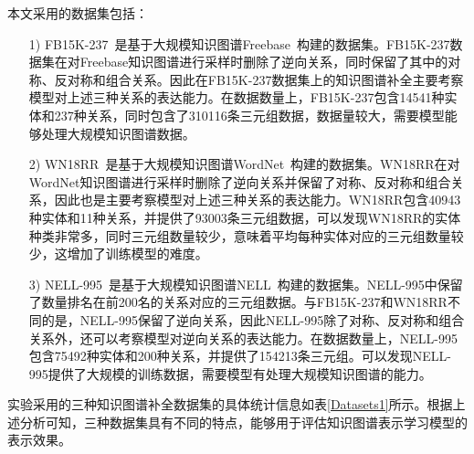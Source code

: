 \documentclass[algorithmlist, AutoFakeBold, AutoFakeSlant, figurelist, tablelist, nomlist, engineering, openany]{seuthesix} %
\begin{document}
本文采用的数据集包括：
\begin{itemize}
  \item [1)]FB15K-237~\cite{toutanova2015representing}是基于大规模知识图谱Freebase~\cite{bollacker2008freebase}构建的数据集。FB15K-237数据集在对Freebase知识图谱进行采样时删除了逆向关系，同时保留了其中的对称、反对称和组合关系。因此在FB15K-237数据集上的知识图谱补全主要考察模型对上述三种关系的表达能力。在数据数量上，FB15K-237包含14541种实体和237种关系，同时包含了310116条三元组数据，数据量较大，需要模型能够处理大规模知识图谱数据。
  \item [2)]WN18RR~\cite{dettmers2018convolutional}是基于大规模知识图谱WordNet~\cite{glorot2010understanding}构建的数据集。WN18RR在对WordNet知识图谱进行采样时删除了逆向关系并保留了对称、反对称和组合关系，因此也是主要考察模型对上述三种关系的表达能力。WN18RR包含40943种实体和11种关系，并提供了93003条三元组数据，可以发现WN18RR的实体种类非常多，同时三元组数量较少，意味着平均每种实体对应的三元组数量较少，这增加了训练模型的难度。
  \item [3)]NELL-995~\cite{xiong2017deeppath}是基于大规模知识图谱NELL~\cite{carlson2010toward}构建的数据集。NELL-995中保留了数量排名在前200名的关系对应的三元组数据。与FB15K-237和WN18RR不同的是，NELL-995保留了逆向关系，因此NELL-995除了对称、反对称和组合关系外，还可以考察模型对逆向关系的表达能力。在数据数量上，NELL-995包含75492种实体和200种关系，并提供了154213条三元组。可以发现NELL-995提供了大规模的训练数据，需要模型有处理大规模知识图谱的能力。
\end{itemize}

实验采用的三种知识图谱补全数据集的具体统计信息如表\ref{Datasets1}所示。根据上述分析可知，三种数据集具有不同的特点，能够用于评估知识图谱表示学习模型的表示效果。
\end{document}
